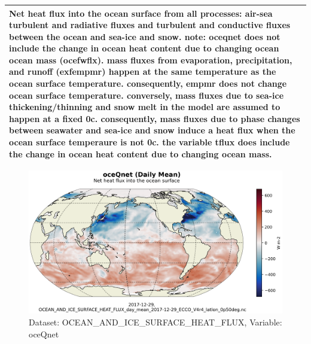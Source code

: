 \begin{longtable}{|m{}|m{}|m{}|m{}|}
\multicolumn{4}{|p{1\textwidth}|}{Net heat flux into the ocean surface from all processes: air-sea turbulent and radiative fluxes and turbulent and conductive fluxes between the ocean and sea-ice and snow. note: oceqnet does not include the change in ocean heat content due to changing ocean ocean mass (ocefwflx). mass fluxes from evaporation, precipitation, and runoff (exfempmr) happen at the same temperature as the ocean surface temperature. consequently, empmr does not change ocean surface temperature. conversely, mass fluxes due to sea-ice thickening/thinning and snow melt in the model are assumed to happen at a fixed 0c. consequently, mass fluxes due to phase changes between seawater and sea-ice and snow induce a heat flux when the ocean surface temperaure is not 0c. the variable tflux does include the change in ocean heat content due to changing ocean mass.} \\ \hline
\end{longtable}

\begin{figure}[H]
\centering
\includegraphics[scale=0.55]{../images/plots/latlon_plots/Ocean_and_Sea-Ice_Surface_Heat_Fluxes/oceQnet.png}
\caption{Dataset: OCEAN\_AND\_ICE\_SURFACE\_HEAT\_FLUX, Variable: oceQnet}
\label{tab:table-OCEAN_AND_ICE_SURFACE_HEAT_FLUX_oceQnet-Plot}
\end{figure}
\pagebreak
